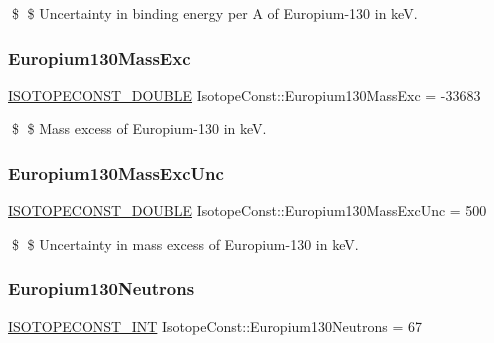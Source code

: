 \$ \$ Uncertainty in binding energy per A of Europium-\/130 in keV. \mbox{\label{group___isotope_const-_europium-_eu130_ga163bcbb66126ef95ad07dfdd209c5cc0}} 
\subsubsection{\texorpdfstring{Europium130\+Mass\+Exc}{Europium130MassExc}}
{\footnotesize\ttfamily \mbox{\hyperlink{group___isotope_const-_macros_ga8f45a7272ce02c0b4c65c44636ed719a}{I\+S\+O\+T\+O\+P\+E\+C\+O\+N\+S\+T\+\_\+\+D\+O\+U\+B\+LE}} Isotope\+Const\+::\+Europium130\+Mass\+Exc = -\/33683}

\$ \$ Mass excess of Europium-\/130 in keV. \mbox{\label{group___isotope_const-_europium-_eu130_ga117c0c39ed7630da434ff3f3f8d9a831}} 
\subsubsection{\texorpdfstring{Europium130\+Mass\+Exc\+Unc}{Europium130MassExcUnc}}
{\footnotesize\ttfamily \mbox{\hyperlink{group___isotope_const-_macros_ga8f45a7272ce02c0b4c65c44636ed719a}{I\+S\+O\+T\+O\+P\+E\+C\+O\+N\+S\+T\+\_\+\+D\+O\+U\+B\+LE}} Isotope\+Const\+::\+Europium130\+Mass\+Exc\+Unc = 500}

\$ \$ Uncertainty in mass excess of Europium-\/130 in keV. \mbox{\label{group___isotope_const-_europium-_eu130_gadeae5c6f304b67df3522d88737422536}} 
\subsubsection{\texorpdfstring{Europium130\+Neutrons}{Europium130Neutrons}}
{\footnotesize\ttfamily \mbox{\hyperlink{group___isotope_const-_macros_ga5f18360b3e99483a35c32d789e62621c}{I\+S\+O\+T\+O\+P\+E\+C\+O\+N\+S\+T\+\_\+\+I\+NT}} Isotope\+Const\+::\+Europium130\+Neutrons = 67}

